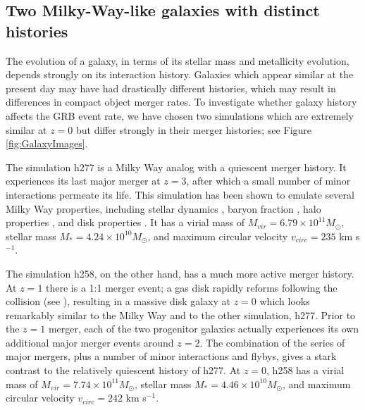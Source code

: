 \documentclass[nofootinbib,twocolumn,prd]{emulateapj}
\newcommand\editremark[1]{{\color{red}#1}}
\newcommand\msun{M_\odot}
\begin{document}
\subsection{Two Milky-Way-like galaxies with distinct histories }

The evolution
of a galaxy, in terms of its stellar mass and metallicity evolution,
depends strongly on its interaction history.  Galaxies which appear
similar at the present day may have had drastically different
histories, which may result in differences in compact object merger
rates.  To investigate whether galaxy history affects the GRB event
rate, we have chosen two simulations which are extremely similar at $z
= 0$ but differ strongly in their merger histories; see Figure \ref{fig:GalaxyImages}.

The simulation h277  is a Milky Way analog with a
quiescent merger history.  It experiences its last major merger at $z
= 3$, after which a small number of minor interactions permeate its
life.  This simulation has been shown to emulate several Milky Way
properties, including stellar dynamics
\citep{Loebman12,Loebman14,Kassin14}, baryon fraction
\citep{Munshi13}, halo properties \citep{Zolotov09,Zolotov10}, and
disk properties \citep{Brooks11}.  It has a virial mass of $M_{vir} =
6.79 \times 10^{11} \msun$, stellar mass $M_* = 4.24 \times 10^{10}
\msun$, and maximum circular velocity $v_{circ} = 235$ km s$^{-1}$.

  The simulation h258, on the other hand, has a much
  more active merger history.  At $z = 1$ there is a 1:1 merger event;
  a gas disk rapidly reforms following the collision (see
  \citet{Governato09}), resulting in a massive disk galaxy at $z = 0$
  which looks remarkably similar to the Milky Way and to the other
  simulation, h277.  Prior to the $z = 1$ merger, each of the two
  progenitor galaxies actually experiences its own additional major
  merger events around $z = 2$.  The combination of
  the series of major mergers, plus a number of minor interactions and
  flybys, gives a stark contrast to the relatively quiescent history
  of h277.  At $z = 0$, h258 has a virial mass of $M_{vir} = 7.74
  \times 10^{11} \msun$, stellar mass $M_* = 4.46 \times 10^{10}
  \msun$, and maximum circular velocity $v_{circ} = 242$ km s$^{-1}$.  %
\end{document}
